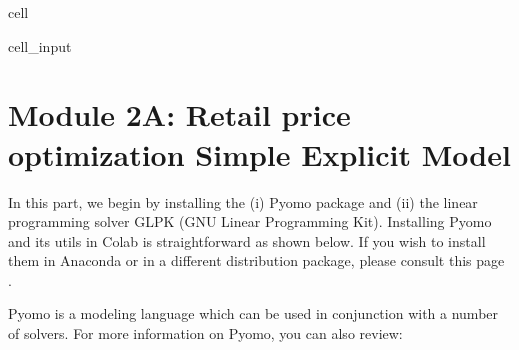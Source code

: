 \documentclass[letterpaper,10pt,english]{jupyterBook}
\begin{document}
\begin{sphinxuseclass}{cell}\begin{sphinxVerbatimInput}

\begin{sphinxuseclass}{cell_input}
\begin{sphinxVerbatim}[commandchars=\\\{\}]
 
\end{sphinxVerbatim}

\end{sphinxuseclass}\end{sphinxVerbatimInput}

\end{sphinxuseclass}
\sphinxstepscope


\section{Module 2A: Retail price optimization \sphinxhyphen{} Simple Explicit Model}
\label{\detokenize{docs/Case1_4_Module2A_Retail_Price_Optimization:module-2a-retail-price-optimization-simple-explicit-model}}\label{\detokenize{docs/Case1_4_Module2A_Retail_Price_Optimization::doc}}
\sphinxAtStartPar
{}

\sphinxAtStartPar
In this part, we begin by installing the (i) Pyomo package and (ii) the linear programming solver GLPK (GNU Linear Programming Kit). Installing Pyomo and its utils in Colab is straightforward as shown below. If you wish to install them in Anaconda or in a different distribution package, please consult this page .

\sphinxAtStartPar
Pyomo is a modeling language which can be used in conjunction with a number of solvers. For more information on Pyomo, you can also review: 
\end{document}
